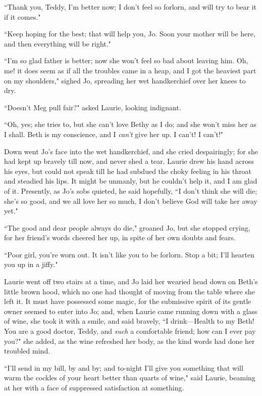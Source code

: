 ``Thank you, Teddy, I'm better now; I
don't feel so forlorn, and will try to bear it if it
comes."

``Keep hoping for the best; that will help you, Jo. Soon your mother will
be here, and then everything will be right."

``I'm so glad father is better; now she
won't feel so bad about leaving him. Oh, me! it does
seem as if all the troubles came in a heap, and I got the heaviest part
on my shoulders," sighed Jo, spreading her wet handkerchief over her
knees to dry.

``Doesn't Meg pull fair?" asked Laurie, looking
indignant.

``Oh, yes; she tries to, but she can't love Bethy as I
do; and she won't miss her as I shall. Beth is my
conscience, and I \emph{can't} give her up. I
can't! I can't!"

Down went Jo's face into the wet handkerchief, and she
cried despairingly; for she had kept up bravely till now, and never shed
a tear. Laurie drew his hand across his eyes, but could not speak till
he had subdued the choky feeling in his throat and steadied his lips. It
might be unmanly, but he couldn't help it, and I am glad
of it. Presently, as Jo's sobs quieted, he said
hopefully, ``I don't think she will die;
she's so good, and we all love her so much, I
don't believe God will take her away yet."

``The good and dear people always do die," groaned Jo, but she stopped
crying, for her friend's words cheered her up, in spite
of her own doubts and fears.

``Poor girl, you're worn out. It isn't
like you to be forlorn. Stop a bit; I'll hearten you up
in a jiffy."

Laurie went off two stairs at a time, and Jo laid her wearied head down
on Beth's little brown hood, which no one had thought of
moving from the table where she left it. It must have possessed some
magic, for the submissive spirit of its gentle owner seemed to enter
into Jo; and, when Laurie came running down with a glass of wine, she
took it with a smile, and said bravely, ``I drink---Health to my Beth!
You are a good doctor, Teddy, and \emph{such} a comfortable friend; how
can I ever pay you?" she added, as the wine refreshed her body, as the
kind words had done her troubled mind.

``I'll send in my bill, by and by; and to-night
I'll give you something that will warm the cockles of
your heart better than quarts of wine," said Laurie, beaming at her with
a face of suppressed satisfaction at something.

